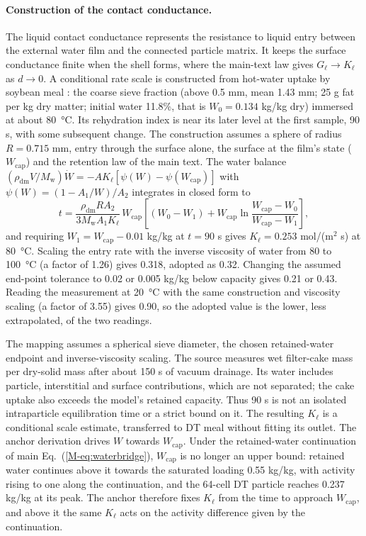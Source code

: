 \paragraph{Construction of the contact conductance.}
\label{sup:contactscale}
The liquid contact conductance represents the resistance to liquid entry
between the external water film and the connected particle matrix. It keeps
the surface conductance finite when the shell forms, where the main-text law
gives $G_\ell\to K_\ell$ as $d\to0$. A conditional rate scale is constructed
from hot-water uptake by soybean meal
\citep{hemmingsen2008water}: the coarse sieve fraction (above 0.5 mm,
mean 1.43 mm; 25 g fat per kg dry matter; initial water 11.8\%, that is
$W_0=0.134$ kg/kg dry) immersed at about \SI{80}{\celsius}. Its
rehydration index is near its later level at the first sample, 90 s,
with some subsequent change. The construction assumes a sphere of radius
$R=0.715$ mm, entry through the surface alone, the surface at the film's state
($W_{\mathrm{cap}}$) and the retention law of the main text. The water
balance $(\rho_{\mathrm{dm}}V/M_{\mathrm w})\dot W
=-A K_\ell[\psi(W)-\psi(W_{\mathrm{cap}})]$ with
$\psi(W)=(1-A_1/W)/A_2$ integrates in closed form to
\[
t=\frac{\rho_{\mathrm{dm}}R A_2}{3M_{\mathrm w}A_1K_\ell}\,
W_{\mathrm{cap}}\!\left[(W_0-W_1)+W_{\mathrm{cap}}
\ln\frac{W_{\mathrm{cap}}-W_0}{W_{\mathrm{cap}}-W_1}\right],
\]
and requiring $W_1=W_{\mathrm{cap}}-0.01$ kg/kg at $t=90$ s gives
$K_\ell=0.253$ mol/(m$^2$ s) at \SI{80}{\celsius}. Scaling the entry
rate with the inverse viscosity of water from 80 to \SI{100}{\celsius}
(a factor of 1.26) gives 0.318, adopted as 0.32. Changing the assumed
end-point tolerance to 0.02 or 0.005
kg/kg below capacity gives 0.21 or 0.43. Reading the measurement at
\SI{20}{\celsius} with the same construction and viscosity scaling
(a factor of 3.55) gives 0.90, so the adopted value is the lower,
less extrapolated, of the two readings.

The mapping assumes a spherical sieve diameter, the chosen retained-water
endpoint and inverse-viscosity scaling. The source measures wet filter-cake
mass per dry-solid mass after about 150 s of vacuum drainage. Its water
includes particle, interstitial and surface contributions, which are not
separated; the cake uptake also exceeds the model's retained capacity.
Thus 90 s is not an isolated intraparticle equilibration time or a strict
bound on it. The resulting $K_\ell$ is a conditional scale estimate,
transferred to DT meal without fitting its outlet.
The anchor derivation drives $W$ towards $W_{\mathrm{cap}}$. Under the
retained-water continuation of main Eq.~(\ref*{M-eq:waterbridge}),
$W_{\mathrm{cap}}$ is no longer an upper bound: retained water continues
above it towards the saturated loading 0.55 kg/kg, with activity rising to
one along the continuation, and the 64-cell DT particle reaches 0.237 kg/kg at
its peak. The anchor therefore fixes $K_\ell$ from the time to approach
$W_{\mathrm{cap}}$, and above it the same $K_\ell$ acts on the activity
difference given by the continuation.

